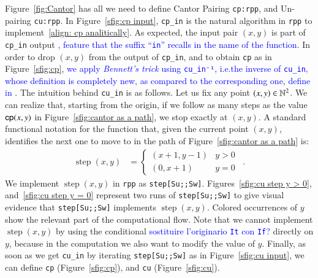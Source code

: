 \documentclass[preprint]{elsarticle}
\theoremstyle{remark}
\begin{document}
Figure~\ref{fig:Cantor} has all we need to define Cantor Pairing \lstinline|cp:rpp|, and Un-pairing \lstinline|cu:rpp|.
In Figure~\ref{sfig:cp input}, \lstinline|cp_in| is the natural algorithm in \lstinline|rpp| to implement~\eqref{align: cp analitically}. As expected, the input pair $(x,y)$ is part of \lstinline|cp_in| output \textcolor{blue}{, feature that the suffix ``\lstinline|in|'' recalls in the name of the function}. In order to drop $(x,y)$ from the output of \lstinline|cp_in|, and to obtain \lstinline|cp| as in Figure~\ref{sfig:cp}, \textcolor{blue}{we apply {\it Bennett's trick} using \lstinline|cu_in⁻¹|, i.e.\@ the inverse of \lstinline|cu_in|, whose definition is completely new, as compared to the corresponding one, define in \cite{DBLP:journals/tcs/PaoliniPR20}}. The intuition behind \lstinline|cu_in| is as follows. Let us fix any point $ (x, y) \in \mathbb{N}^2 $. We can realize that, starting from the origin, if we follow as many steps as the value $ \mathsf{cp}(x, y) $ in Figure~\ref{sfig:cantor as a path}, we stop exactly at $ (x,y) $. A standard functional notation for the function that, given the current point $ (x,y) $, identifies the next one to move to in the path of Figure~\ref{sfig:cantor as a path} is:
\begin{align*}
    \operatorname{step}(x,y) & =
    \begin{cases} (x+1,y-1) &  y > 0 \\ (0, x+1) &   y = 0 \end{cases}
    \enspace .
\end{align*}
We implement $ \operatorname{step}(x,y) $ in \lstinline|rpp| as \lstinline|step[Su;;Sw]|. Figures~\ref{sfig:cu step y > 0}, and~\ref{sfig:cu step y = 0} represent two runs of \lstinline|step[Su;;Sw]| to give visual evidence that \lstinline|step[Su;;Sw]| implements $\operatorname{step}(x,y)$. Colored occurrences of $ y $ show the relevant part of the computational flow. Note that we cannot implement $ \operatorname{step}(x,y) $ by using the conditional \textcolor{blue}{sostituire l'originario \lstinline|It| con \lstinline|If|?}  directly on $y$, because in the computation we also want to modify the value of $y$. Finally, as soon as we get \lstinline|cu_in| by iterating \lstinline|step[Su;;Sw]| as in Figure~\ref{sfig:cu input}, we can define \lstinline|cp| (Figure~\ref{sfig:cp}), and \lstinline|cu| (Figure~\ref{sfig:cu}).
\end{document}
